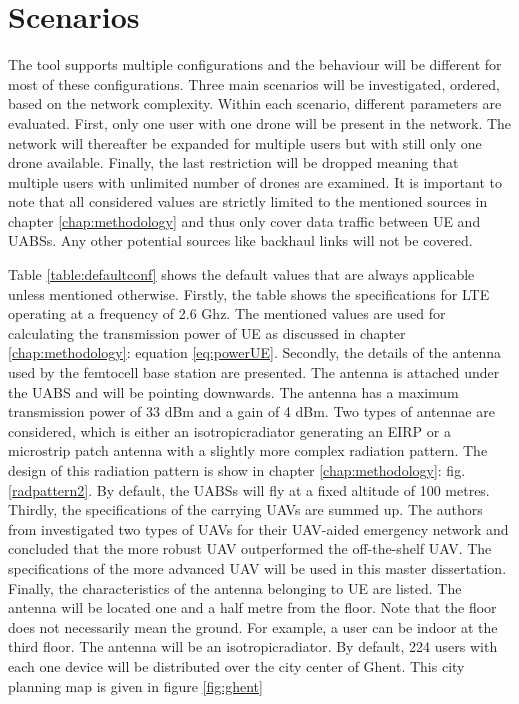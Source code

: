 \chapter{Scenarios}
\label{chap:scenarios} 
The tool supports multiple configurations and the behaviour will be different for most of these configurations. Three main scenarios 
will be investigated, ordered, based on the network complexity. Within each scenario, different parameters are evaluated.
First, only one user with one drone will be present in the network. The network will thereafter be expanded
for multiple users but with still only one drone available. Finally, the last restriction will be dropped meaning 
that multiple users with unlimited number of drones are examined.
It is important to note that 
all considered values are strictly limited to the mentioned sources in chapter \ref{chap:methodology} and thus only cover data traffic 
between \gls{UE} and \gls{UABS}s. Any other potential sources like backhaul links will not be covered.

Table \ref{table:defaultconf} shows the default values that are always applicable unless mentioned otherwise. 
Firstly, the table shows 
the specifications for LTE operating at a frequency of 2.6 Ghz. The mentioned values are used for calculating 
the transmission power of \gls{UE} as discussed in chapter \ref{chap:methodology}: equation \ref{eq:powerUE}. 
Secondly, the details of the antenna
used by the femtocell base station are presented. The antenna is attached under the \gls{UABS} and will be pointing downwards. 
The antenna has a maximum transmission power of 33 dBm and 
a gain of 4 dBm. Two types of antennae are considered, which is either an \gls{isotropicradiator}  generating an \gls{EIRP} 
or a microstrip patch antenna with a slightly more complex radiation pattern. The design of this radiation pattern is show 
in chapter \ref{chap:methodology}: fig. \ref{radpattern2}. By default, the \gls{UABS}s will fly at a fixed altitude of 100 metres.
Thirdly, the specifications of the carrying \gls{UAV}s are summed up. 
The authors from \cite{J2} investigated two types of \gls{UAV}s for their \gls{UAV}-aided emergency network 
and concluded that the more robust \gls{UAV} outperformed the off-the-shelf \gls{UAV}.
The specifications of the more advanced \gls{UAV} will be used in this master dissertation.
Finally, the characteristics of the antenna belonging to \gls{UE} are listed. The antenna will be located 
one and a half metre from the floor. Note that the floor does not necessarily mean the ground.
For example, a user can be indoor at the third floor.
The antenna will be an \gls{isotropicradiator}. By default, 224 users with each one device 
will be distributed over the city center of Ghent. This city planning map is given in figure \ref{fig:ghent}

